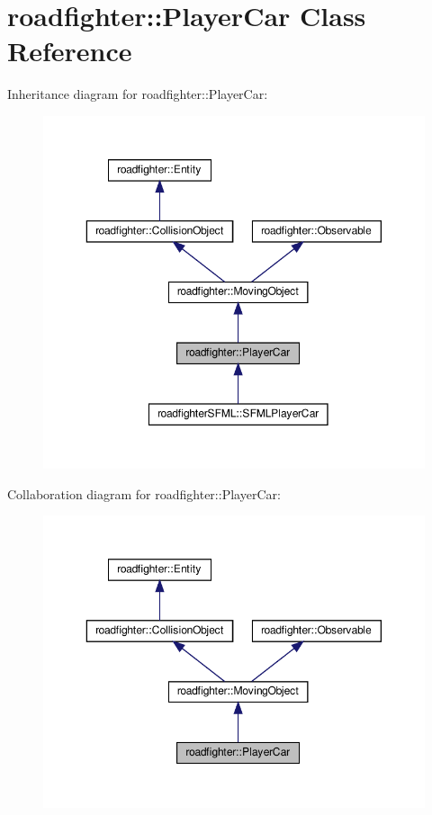 \hypertarget{classroadfighter_1_1PlayerCar}{}\section{roadfighter\+:\+:Player\+Car Class Reference}
\label{classroadfighter_1_1PlayerCar}


Inheritance diagram for roadfighter\+:\+:Player\+Car\+:
\nopagebreak
\begin{figure}[H]
\begin{center}
\leavevmode
\includegraphics[width=350pt]{classroadfighter_1_1PlayerCar__inherit__graph}
\end{center}
\end{figure}


Collaboration diagram for roadfighter\+:\+:Player\+Car\+:
\nopagebreak
\begin{figure}[H]
\begin{center}
\leavevmode
\includegraphics[width=350pt]{classroadfighter_1_1PlayerCar__coll__graph}
\end{center}
\end{figure}
